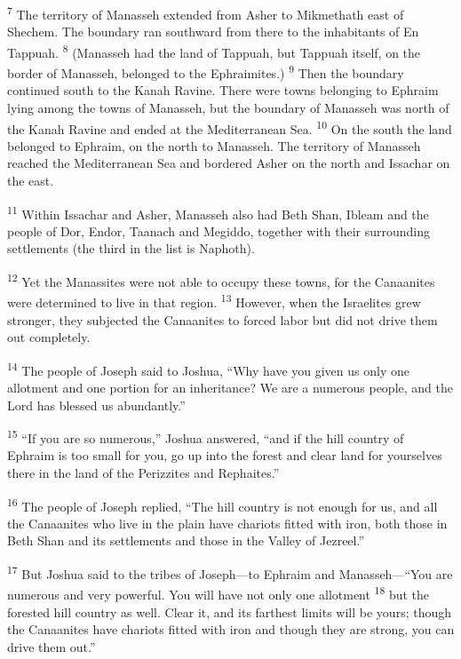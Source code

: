 \documentclass[12pt,twoside]{article}
\newcommand{\vs}[1]{\textsuperscript{#1}}
\begin{document}
\begin{adjustwidth}{0.5cm}{0cm}
  \hspace{0.5cm}\vs{7} The territory of Manasseh extended from Asher to Mikmethath east of Shechem. The boundary ran southward from there to the inhabitants of En Tappuah.
  \vs{8} (Manasseh had the land of Tappuah, but Tappuah itself, on the border of Manasseh, belonged to the Ephraimites.)
  \vs{9} Then the boundary continued south to the Kanah Ravine. There were towns belonging to Ephraim lying among the towns of Manasseh, but the boundary of Manasseh was north of the Kanah Ravine and ended at the Mediterranean Sea.
  \vs{10} On the south the land belonged to Ephraim, on the north to Manasseh. The territory of Manasseh reached the Mediterranean Sea and bordered Asher on the north and Issachar on the east.

  \vs{11} Within Issachar and Asher, Manasseh also had Beth Shan, Ibleam and the people of Dor, Endor, Taanach and Megiddo, together with their surrounding settlements (the third in the list is Naphoth).
\end{adjustwidth}

\noindent \vs{12} Yet the Manassites were not able to occupy these towns, for the Canaanites were determined to live in that region.
\vs{13} However, when the Israelites grew stronger, they subjected the Canaanites to forced labor but did not drive them out completely.

\vs{14} The people of Joseph said to Joshua, ``Why have you given us only one allotment and one portion for an inheritance? We are a numerous people, and the Lord has blessed us abundantly.''

\vs{15} ``If you are so numerous,'' Joshua answered, ``and if the hill country of Ephraim is too small for you, go up into the forest and clear land for yourselves there in the land of the Perizzites and Rephaites.''

\vs{16} The people of Joseph replied, ``The hill country is not enough for us, and all the Canaanites who live in the plain have chariots fitted with iron, both those in Beth Shan and its settlements and those in the Valley of Jezreel.''

\vs{17} But Joshua said to the tribes of Joseph---to Ephraim and Manasseh---``You are numerous and very powerful. You will have not only one allotment
\vs{18} but the forested hill country as well. Clear it, and its farthest limits will be yours; though the Canaanites have chariots fitted with iron and though they are strong, you can drive them out.''
\end{document}
